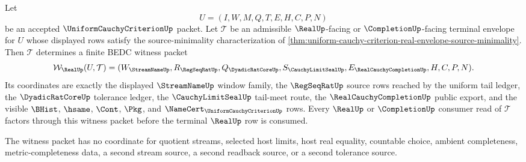 \begin{theorem}
\label{thm:uniform-cauchy-criterion-real-envelope-witness-extraction}
Let
$$
U=(I,W,M,Q,T,E,H,C,P,N)
$$
be an accepted $\UniformCauchyCriterionUp$ packet. Let $\mathcal{T}$ be an admissible $\RealUp$-facing or $\CompletionUp$-facing terminal envelope for $U$ whose displayed rows satisfy the source-minimality characterization of \autoref{thm:uniform-cauchy-criterion-real-envelope-source-minimality}. Then $\mathcal{T}$ determines a finite BEDC witness packet
$$
\mathcal{W}_{\RealUp}(U,\mathcal{T})=
(W_{\StreamNameUp},R_{\RegSeqRatUp},Q_{\DyadicRatCoreUp},
S_{\CauchyLimitSealUp},E_{\RealCauchyCompletionUp},H,C,P,N).
$$
Its coordinates are exactly the displayed $\StreamNameUp$ window family, the $\RegSeqRatUp$ source rows reached by the uniform tail ledger, the $\DyadicRatCoreUp$ tolerance ledger, the $\CauchyLimitSealUp$ tail-meet route, the $\RealCauchyCompletionUp$ public export, and the visible $\BHist$, $\hsame$, $\Cont$, $\Pkg$, and $\NameCert_{\UniformCauchyCriterionUp}$ rows. Every $\RealUp$ or $\CompletionUp$ consumer read of $\mathcal{T}$ factors through this witness packet before the terminal $\RealUp$ row is consumed.

The witness packet has no coordinate for quotient streams, selected host limits, host real equality, countable choice, ambient completeness, metric-completeness data, a second stream source, a second readback source, or a second tolerance source.
\end{theorem}
